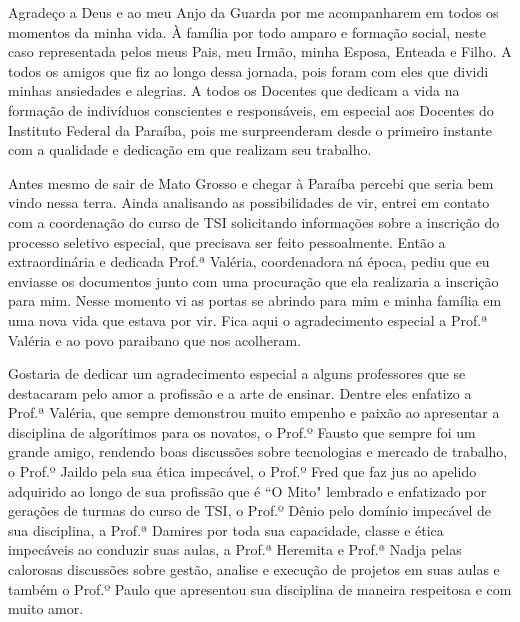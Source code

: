 
\begin{agradecimentos}[AGRADECIMENTOS]

    Agradeço a Deus e ao meu Anjo da Guarda  por me acompanharem em todos os momentos da minha vida. 
    À família por todo amparo e formação social, neste caso representada pelos meus Pais, meu Irmão, minha Esposa, Enteada e Filho.
    A todos os amigos que fiz ao longo dessa jornada, pois foram com eles que dividi minhas ansiedades e alegrias. 
    A todos os Docentes que dedicam a vida na formação de indivíduos conscientes e responsáveis, em especial aos Docentes do Instituto Federal da Paraíba, pois me surpreenderam desde o primeiro instante com a qualidade e dedicação em que realizam seu trabalho.

    Antes mesmo de sair de Mato Grosso e chegar à Paraíba percebi que seria bem vindo nessa terra. Ainda analisando as possibilidades de vir, entrei em contato com a coordenação do curso de TSI solicitando informações sobre a inscrição do processo seletivo especial, que precisava ser feito pessoalmente. Então a extraordinária e dedicada Prof.ª Valéria, coordenadora ná época, pediu que eu enviasse os documentos junto com uma procuração que ela realizaria a inscrição para mim. Nesse momento vi as portas se abrindo para mim e minha família em uma nova vida que estava por vir. Fica aqui o agradecimento especial a Prof.ª Valéria e ao povo paraibano que nos acolheram.

    Gostaria de dedicar um agradecimento especial a alguns professores que se destacaram pelo amor a profissão e a arte de ensinar. Dentre eles enfatizo a Prof.ª Valéria, que sempre demonstrou muito empenho e paixão ao apresentar a disciplina de algorítimos para os novatos, o Prof.º Fausto que sempre foi um grande amigo, rendendo boas discussões sobre tecnologias e mercado de trabalho, o Prof.º Jaildo pela sua ética impecável, o Prof.º Fred que faz jus ao apelido adquirido ao longo de sua profissão que é ``O Mito" \space lembrado e enfatizado por gerações de turmas do curso de TSI, o Prof.º Dênio pelo domínio impecável de sua disciplina, a Prof.ª Damires por toda sua capacidade, classe e ética impecáveis ao conduzir suas aulas, a Prof.ª Heremita e Prof.ª Nadja pelas calorosas discussões sobre gestão, analise e execução de projetos em suas aulas e também o Prof.º Paulo que apresentou sua disciplina de maneira respeitosa e com muito amor.
    

\end{agradecimentos}
